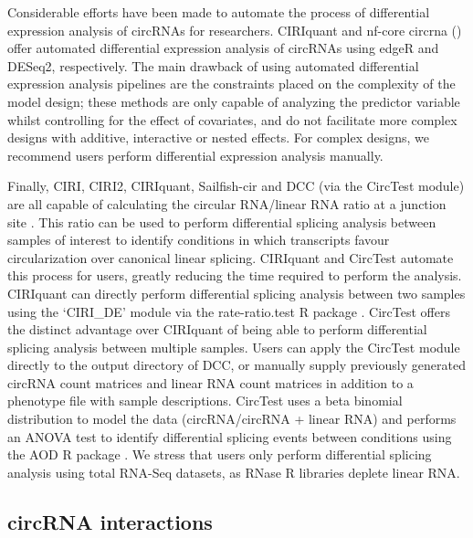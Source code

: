 Considerable efforts have been made to automate the process of differential expression analysis of circRNAs for researchers. CIRIquant and nf-core circrna (\cite{CIRIquant,Digby2023Dec}) offer automated differential expression analysis of circRNAs using edgeR and DESeq2, respectively. The main drawback of using automated differential expression analysis pipelines are the constraints placed on the complexity of the model design; these methods are only capable of analyzing the predictor variable whilst controlling for the effect of covariates, and do not facilitate more complex designs with additive, interactive or nested effects. For complex designs, we recommend users perform differential expression analysis manually. \par
Finally, CIRI, CIRI2, CIRIquant, Sailfish-cir and DCC (via the CircTest module) are all capable of calculating the circular RNA/linear RNA ratio at a junction site \cite{CIRI, CIRI2, CIRIquant, DCC}. This ratio can be used to perform differential splicing analysis between samples of interest to identify conditions in which transcripts favour circularization over canonical linear splicing. CIRIquant and CircTest automate this process for users, greatly reducing the time required to perform the analysis. CIRIquant can directly perform differential splicing analysis between two samples using the `CIRI\_DE' module via the rate-ratio.test R package \cite{Fay2022May}. CircTest offers the distinct advantage over CIRIquant of being able to perform differential splicing analysis between multiple samples. Users can apply the CircTest module directly to the output directory of DCC, or manually supply previously generated circRNA count matrices and linear RNA count matrices in addition to a phenotype file with sample descriptions. CircTest uses a beta binomial distribution to model the data (circRNA/circRNA + linear RNA) and performs an ANOVA test to identify differential splicing events between conditions using the AOD R package \cite{Lancelot2022Apr}. We stress that users only perform differential splicing analysis using total RNA-Seq datasets, as RNase R libraries deplete linear RNA.

\subsection{circRNA interactions}

